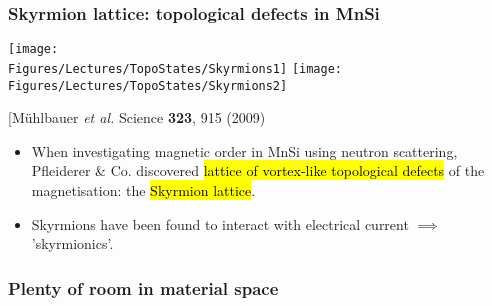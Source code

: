 \begin{frame}[label=Skyrmions]
\frametitle{Skyrmion lattice: topological defects in MnSi}

\centerline{\texttt{[image: \\Figures/Lectures/TopoStates/Skyrmions1]}
\texttt{[image: \\Figures/Lectures/TopoStates/Skyrmions2]}}

\centerline{\small{[M\"uhlbauer {\em et al.} Science {\bf 323}, 915 (2009)}}

\begin{itemize}
\item
When investigating magnetic order in MnSi using neutron scattering, Pfleiderer \& Co. discovered \hl{lattice of vortex-like topological defects} of the magnetisation: the \hl{Skyrmion lattice}. 


\item
Skyrmions have been found to interact with electrical current $\implies$ 'skyrmionics'.

\end{itemize}
\end{frame}



\begin{frame}[label=Diversity]

\frametitle{Plenty of room in material space}
\pause                          
\centerline{}

\end{frame}



